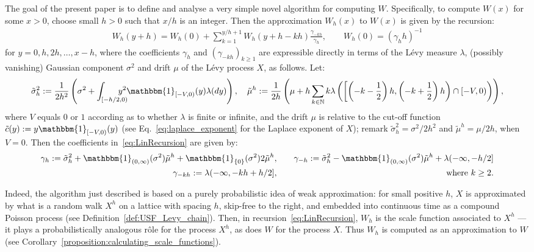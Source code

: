 \documentclass[pdftex,oneside,11pt,reqno]{amsart}
\theoremstyle{definition}
\theoremstyle{theorem}
\theoremstyle{remark}
\numberwithin{equation}{section}
\numberwithin{definition}{section}
\begin{document}
The goal of the present paper is to define and analyse a very simple novel algorithm for computing $W$. Specifically, to compute $W(x)$ for some $x>0$, choose small $h>0$ such that $x/h$ is an integer. Then the approximation ${W}_h(x)$ to ${W}(x)$ is given by the recursion:
\begin{eqnarray}
\label{eq:LinRecursion}
{W}_h(y+h)={W}_h(0)+\sum_{k=1}^{y/h+1}{W}_h(y+h-kh)\frac{\gamma_{-kh}}{\gamma_{h}},\qquad {W}_h(0)=(\gamma_hh)^{-1}
\end{eqnarray}
for $y=0,h,2h,\ldots,x-h$, where the coefficients $\gamma_h$ and $(\gamma_{-kh})_{k\geq 1}$ are expressible directly in terms of the L\'evy measure ${\lambda}$,
(possibly vanishing) Gaussian component $\sigma^2$ and drift $\mu$ of the L\'evy process $X$, as follows. Let:
\footnotesize
\begin{eqnarray*}
\tilde{\sigma}^2_h :=  
\frac{1}{2h^2}\left({\sigma^2}+\int_{[-h/2,0)}\!\!\!\!\!\!\!\!y^2{\mathbbm{1}_{[-V,0)}}(y){\lambda}(dy)\right),  \quad
\tilde{\mu}^h  :=  \frac{1}{2h} 
\left(\mu +h\sum_{k\in\mathbb{N}}k{\lambda}\left(\left[\left(-k-\frac{1}{2}\right)h,\left(-k+\frac{1}{2}\right)h\right)\cap[-V,0)\right)
\right),
\end{eqnarray*}
\normalsize
where $V$ equals $0$ or
$1$ according as to whether ${\lambda}$ is finite or infinite, and the drift $\mu$ is relative to the cut-off function $\tilde{c}(y):=y\mathbbm{1}_{[-V,0)}(y)$ (see Eq.~\ref{eq:laplace_exponent} for the Laplace exponent of $X$); remark 
$\tilde{\sigma}^2_h  =  \sigma^2/2h^2$
and
$\tilde{\mu}^h  =  \mu/2h$, when $V=0$. Then the coefficients in~\eqref{eq:LinRecursion}
are given by:
\begin{eqnarray}
\label{eq:Explicit_1}
\gamma_h:=\tilde{\sigma}^2_h+\mathbbm{1}_{(0,\infty)}({\sigma^2})\tilde{\mu}^h
+\mathbbm{1}_{\{0\}}({\sigma^2})2\tilde{\mu}^h,& & \quad 
\gamma_{-h}:=\tilde{\sigma}^2_h-\mathbbm{1}_{(0,\infty)}({\sigma^2})\tilde{\mu}^h+{\lambda}(-\infty,-h/2]\\
\gamma_{-kh}:={\lambda}(-\infty,-kh+h/2],& &\quad\text{where } k\geq 2.
\label{eq:Explicit_2}
\end{eqnarray}

Indeed, the algorithm just described is based on a purely probabilistic idea of weak approximation: for small positive $h$, $X$ is approximated by what is a random walk $X^h$ on a lattice with spacing $h$, skip-free to the right, and embedded into continuous time as a compound Poisson process (see Definition~\ref{def:USF_Levy_chain}). Then, in recursion~\eqref{eq:LinRecursion}, ${W}_h$ is the scale function associated to $X^h$ --- it plays a probabilistically analogous r\^ole for the process $X^h$, as does ${W}$ for the process $X$. Thus ${W}_h$ is computed as an approximation to ${W}$ (see Corollary~\ref{proposition:calculating_scale_functions}).
\end{document}
